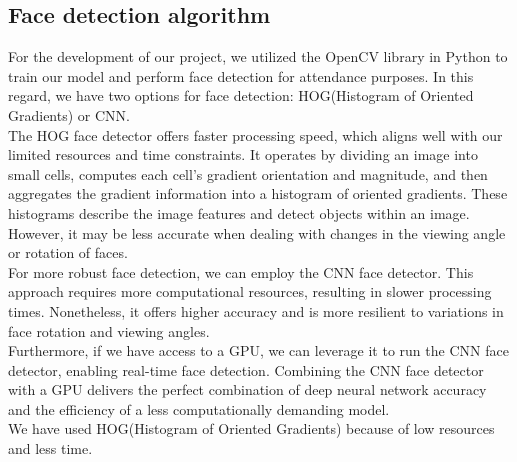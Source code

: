 \subsection{Face detection algorithm}
For the development of our project, we utilized the OpenCV library in Python to train our model and perform face detection for attendance purposes. In this regard, we have two options for face detection: 
HOG(Histogram of Oriented Gradients) or CNN.\\


The HOG face detector offers faster processing speed, which aligns well with our limited resources and time constraints. It operates by dividing an image into small cells, computes each cell’s gradient orientation and magnitude, and then aggregates the gradient information into a histogram of oriented gradients. These histograms describe the image features and detect objects within an image. However, it may be less accurate when dealing with changes in the viewing angle or rotation of faces.\\

For more robust face detection, we can employ the CNN face detector. This approach requires more computational resources, resulting in slower processing times. Nonetheless, it offers higher accuracy and is more resilient to variations in face rotation and viewing angles.\\

Furthermore, if we have access to a GPU, we can leverage it to run the CNN face detector, enabling real-time face detection. Combining the CNN face detector with a GPU delivers the perfect combination of deep neural network accuracy and the efficiency of a less computationally demanding model.\\

We have used HOG(Histogram of Oriented Gradients) because of low resources and less time.\\



